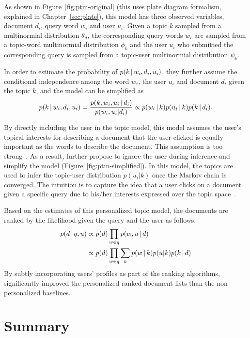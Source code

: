 
As shown in Figure~\ref{fig:ptm-original} (this uses plate diagram
formalism, explained in Chapter~\ref{sec:plate}), this model has three observed
variables, document $d_i$, query word $w_i$ and user $u_i$. Given a topic $k$ sampled
from a multinormial distribution $\theta_d$, the corresponding query words $w_i$ are sampled from 
a topic-word multinormial distribution $\phi_k$ and the user $u_i$ who submitted the corresponding query 
is sampled from a topic-user multinormial distribution $\psi_k$.

In order to estimate the probability of $p(k \, | \, w_i, d_i, u_i)$,
they further assume the conditional independence among the word $w_i$,
the user $u_i$ and document $d_i$ given the topic $k$, and the model
can be simplified as
\begin{align}
p(k \, | \, w_i, d_i, u_i) = \frac{p(k,w_i, u_i  \, | \,  d_i)}{p(w_i, u_i | d_i)} \propto p(w_i \, | \, k) p(u_i \, | \, k) p (k \, | \, d_i).
\end{align}

By directly including the user in the topic model, this model assumes
the user's topical interests for describing a document that the user
clicked is equally important as the words to describe the
document. This assumption is too strong~\citep{Carman-2010}. As a
result, \citet{Harvey-2013} further propose to ignore the user during
inference and simplify the model (Figure~\ref{fig:ptm-simplified}). In
this model, the topics are used to infer the topic-user distribution
$p(u_i|k)$ once the Markov chain is converged. The intuition is to
capture the idea that a user clicks on a document given a specific
query due to his/her interests expressed over the topic
space~\citep{Harvey-2013}.

Based on the estimates of this personalized topic model, the documents are ranked by the likelihood given the query and the user as follows,
\begin{align}
p(d  \, | \,  q,u) &\propto p(d) \prod_{w \in q} p(w, u  \, | \,  d)\\
&\propto p(d) \prod_{w \in q} \sum_k p(w \, | \, k) p(u|k) p(k \, | \, d) \notag
\end{align}
By subtly incorporating users' profiles as part of the ranking algorithms, \citet{Harvey-2013} significantly improved the personalized ranked document lists than the non personalized baselines.

\section{Summary}

